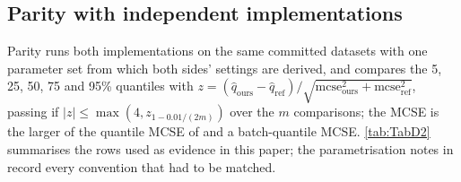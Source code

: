 \subsection{Parity with independent implementations}\label{app:parity}

Parity runs both implementations on the same committed datasets with one parameter set from which
both sides' settings are derived, and compares the 5, 25, 50, 75 and 95\% quantiles with $z =
(\hat q_{\mathrm{ours}} - \hat q_{\mathrm{ref}})/\sqrt{\mathrm{mcse}^2_{\mathrm{ours}} +
\mathrm{mcse}^2_{\mathrm{ref}}}$, passing if $|z| \le \max(4, z_{1 - 0.01/(2m)})$ over the $m$
comparisons; the MCSE is the larger of the quantile MCSE of \citet{vehtari2021rank} and a
batch-quantile MCSE.
\cref{tab:TabD2} summarises the rows used as evidence in this paper; the parametrisation notes
in  record every convention that had to be matched.
